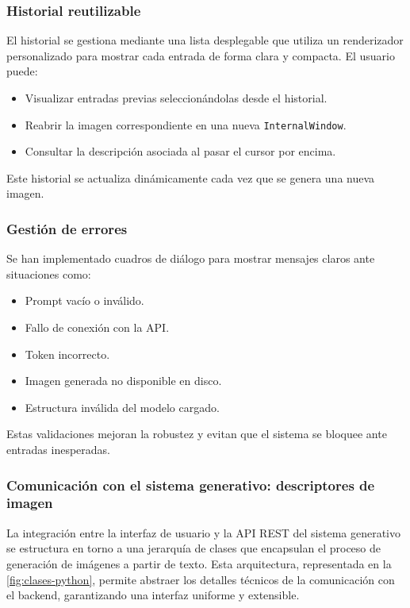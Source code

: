 \subsubsection{Historial reutilizable}

El historial se gestiona mediante una lista desplegable que utiliza un renderizador personalizado para mostrar cada entrada de forma clara y compacta. El usuario puede:

\begin{itemize}
    \item Visualizar entradas previas seleccionándolas desde el historial.
    \item Reabrir la imagen correspondiente en una nueva \texttt{InternalWindow}.
    \item Consultar la descripción asociada al pasar el cursor por encima.
\end{itemize}

Este historial se actualiza dinámicamente cada vez que se genera una nueva imagen.

\subsubsection{Gestión de errores}

Se han implementado cuadros de diálogo para mostrar mensajes claros ante situaciones como:

\begin{itemize}
    \item Prompt vacío o inválido.
    \item Fallo de conexión con la API.
    \item Token incorrecto.
    \item Imagen generada no disponible en disco.
    \item Estructura inválida del modelo cargado.
\end{itemize}

Estas validaciones mejoran la robustez y evitan que el sistema se bloquee ante entradas inesperadas.

\subsubsection{Comunicación con el sistema generativo: descriptores de imagen}

La integración entre la interfaz de usuario y la API REST del sistema generativo se estructura en torno a una jerarquía de clases que encapsulan el proceso de generación de imágenes a partir de texto. Esta arquitectura, representada en la \autoref{fig:clases-python}, permite abstraer los detalles técnicos de la comunicación con el backend, garantizando una interfaz uniforme y extensible.

